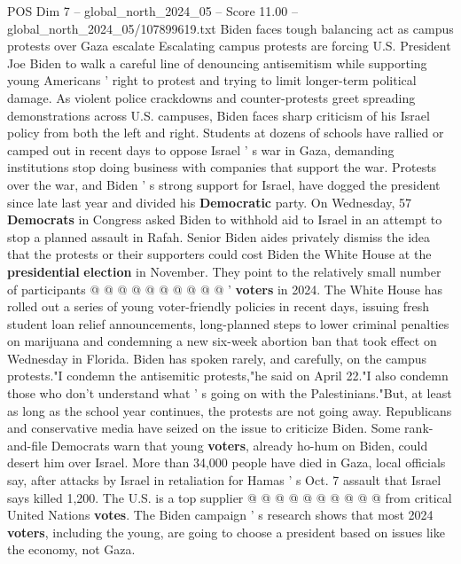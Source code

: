 \begin{textsample}{POS Dim 7 – global\_north\_2024\_05 – Score 11.00 – global\_north\_2024\_05/107899619.txt}  \label{ex:f7_pos_052}
Biden faces tough balancing act as campus protests over Gaza escalate Escalating campus protests are forcing U.S.
President Joe Biden to walk a careful line of denouncing antisemitism while supporting young Americans ' right to protest and trying to limit longer-term political damage.
As violent police crackdowns and counter-protests greet spreading demonstrations across U.S. campuses, Biden faces sharp criticism of his Israel policy from both the left and right.
Students at dozens of schools have rallied or camped out in recent days to oppose Israel ' s war in Gaza, demanding institutions stop doing business with companies that support the war.
Protests over the war, and Biden ' s strong support for Israel, have dogged the president since late last year and divided his \textbf{Democratic} party.
On Wednesday, 57 \textbf{Democrats} in Congress asked Biden to withhold aid to Israel in an attempt to stop a planned assault in Rafah.
Senior Biden aides privately dismiss the idea that the protests or their supporters could cost Biden the White House at the \textbf{presidential} \textbf{election} in November.
They point to the relatively small number of participants @ @ @ @ @ @ @ @ @ @ ' \textbf{voters} in 2024.
The White House has rolled out a series of young voter-friendly policies in recent days, issuing fresh student loan relief announcements, long-planned steps to lower criminal penalties on marijuana and condemning a new six-week abortion ban that took effect on Wednesday in Florida.
Biden has spoken rarely, and carefully, on the campus protests."I condemn the antisemitic protests,"he said on April 22."I also condemn those who don't understand what ' s going on with the Palestinians."But, at least as long as the school year continues, the protests are not going away.
Republicans and conservative media have seized on the issue to criticize Biden.
Some rank-and-file Democrats warn that young \textbf{voters}, already ho-hum on Biden, could desert him over Israel.
More than 34,000 people have died in Gaza, local officials say, after attacks by Israel in retaliation for Hamas ' s Oct. 7 assault that Israel says killed 1,200.
The U.S. is a top supplier @ @ @ @ @ @ @ @ @ @ from critical United Nations \textbf{votes}.
The Biden campaign ' s research shows that most 2024 \textbf{voters}, including the young, are going to choose a president based on issues like the economy, not Gaza.

\end{textsample}
